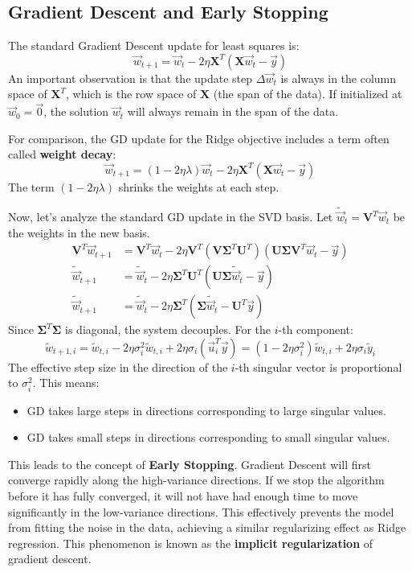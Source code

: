 \documentclass[11pt]{article}
\newcommand{\mat}[1]{\mathbf{#1}}
\begin{document}
\subsection{Gradient Descent and Early Stopping}
The standard Gradient Descent update for least squares is:
\begin{equation}
    \vec{w}_{t+1} = \vec{w}_t - 2\eta \mat{X}^T(\mat{X}\vec{w}_t - \vec{y})
\end{equation}
An important observation is that the update step $\Delta \vec{w}_t$ is always in the column space of $\mat{X}^T$, which is the row space of $\mat{X}$ (the span of the data). If initialized at $\vec{w}_0 = \vec{0}$, the solution $\vec{w}_t$ will always remain in the span of the data.

For comparison, the GD update for the Ridge objective includes a term often called \textbf{weight decay}:
\begin{equation}
    \vec{w}_{t+1} = (1 - 2\eta\lambda)\vec{w}_t - 2\eta \mat{X}^T(\mat{X}\vec{w}_t - \vec{y})
\end{equation}
The term $(1 - 2\eta\lambda)$ shrinks the weights at each step.

Now, let's analyze the standard GD update in the SVD basis. Let $\tilde{\vec{w}}_t = \mat{V}^T \vec{w}_t$ be the weights in the new basis.
\begin{align*}
    \mat{V}^T\vec{w}_{t+1} &= \mat{V}^T\vec{w}_t - 2\eta \mat{V}^T (\mat{V}\mat{\Sigma}^T\mat{U}^T)(\mat{U}\mat{\Sigma}\mat{V}^T \vec{w}_t - \vec{y}) \\
    \tilde{\vec{w}}_{t+1} &= \tilde{\vec{w}}_t - 2\eta \mat{\Sigma}^T\mat{U}^T(\mat{U}\mat{\Sigma}\tilde{\vec{w}}_t - \vec{y}) \\
    \tilde{\vec{w}}_{t+1} &= \tilde{\vec{w}}_t - 2\eta \mat{\Sigma}^T(\mat{\Sigma}\tilde{\vec{w}}_t - \mat{U}^T\vec{y})
\end{align*}
Since $\mat{\Sigma}^T\mat{\Sigma}$ is diagonal, the system decouples. For the $i$-th component:
\begin{equation}
    \tilde{w}_{t+1,i} = \tilde{w}_{t,i} - 2\eta \sigma_i^2 \tilde{w}_{t,i} + 2\eta \sigma_i (\vec{u}_i^T \vec{y}) = (1 - 2\eta\sigma_i^2)\tilde{w}_{t,i} + 2\eta\sigma_i \tilde{y}_i
\end{equation}
The effective step size in the direction of the $i$-th singular vector is proportional to $\sigma_i^2$. This means:
\begin{itemize}
    \item GD takes large steps in directions corresponding to large singular values.
    \item GD takes small steps in directions corresponding to small singular values.
\end{itemize}
This leads to the concept of \textbf{Early Stopping}. Gradient Descent will first converge rapidly along the high-variance directions. If we stop the algorithm before it has fully converged, it will not have had enough time to move significantly in the low-variance directions. This effectively prevents the model from fitting the noise in the data, achieving a similar regularizing effect as Ridge regression. This phenomenon is known as the \textbf{implicit regularization} of gradient descent.
\end{document}
